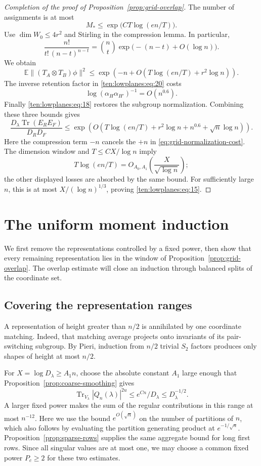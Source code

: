 \begin{proof}[Completion of the proof of Proposition~\ref{prop:grid-overlap}]
The number of assignments is at most
\[
 M_*\le\exp\!\bigl(C T\log(en/T)\bigr).
\]
Use \(\dim W_0\le4r^2\) and Stirling in the compression lemma.  In
particular,
\[
 \frac{n!}{t!\,(n-t)^{n-t}}
 =\binom nt\exp\!\bigl(-(n-t)+O(\log n)\bigr).
\]
We obtain
\[
 \mathbb E\|(T_A\otimes T_B)\phi\|^2
 \le
 \exp\!\left(-n+
 O\!\left(T\log(en/T)+r^2\log n\right)\right).
\]
The inverse retention factor in \eqref{ten:lowplanes:eq:20} costs
\[
 \log(\alpha_H\alpha_{H'})^{-1}=O(n^{0.6}).
\]
Finally \eqref{ten:lowplanes:eq:18} restores the subgroup normalization.
Combining these three bounds gives
\[
 \frac{D_\lambda\operatorname{Tr}(E_RE_F)}{D_RD_F}
 \le
 \exp\!\left(O\!\left(
 T\log(en/T)+r^2\log n+n^{0.6}+\sqrt n\log n
 \right)\right).
\]
Here the compression term \(-n\) cancels the \(+n\) in
\eqref{eq:grid-normalization-cost}.  The dimension window and
\(T\le CX/\log n\) imply
\[
 T\log(en/T)=O_{A_0,A_1}\!\left(\frac{X}{\sqrt{\log n}}\right);
\]
the other displayed losses are absorbed by the same bound.
For sufficiently large \(n\), this is at most
\(X/(\log n)^{1/3}\), proving \eqref{ten:lowplanes:eq:15}.
\end{proof}


\section{The uniform moment induction}
\label{ten:lowplanes:part:309}
We first remove the representations controlled by a fixed power, then show that every remaining representation lies in the window of Proposition~\ref{prop:grid-overlap}. The overlap estimate will close an induction through balanced splits of the coordinate set.

\subsection{Covering the representation ranges}
A representation of height greater than $n/2$ is annihilated by one coordinate matching. Indeed, that matching average projects onto invariants of its pair-switching subgroup. By Pieri, induction from $n/2$ trivial $S_2$ factors produces only shapes of height at most $n/2$.

For $X=\log D_\lambda\ge A_1n$, choose the absolute constant $A_1$ large enough that Proposition~\ref{prop:coarse-smoothing} gives
\[
 \operatorname{Tr}_{V_\lambda}|Q_n(\lambda)|^{2u}
 \le e^{Cn}/D_\lambda\le D_\lambda^{-1/2}.
\]
A larger fixed power makes the sum of the regular contributions in this range at most $n^{-12}$. Here we use the bound $e^{O(\sqrt n)}$ on the number of partitions of $n$, which also follows by evaluating the partition generating product at $e^{-1/\sqrt n}$. Proposition~\ref{prop:sparse-rows} supplies the same aggregate bound for long first rows. Since all singular values are at most one, we may choose a common fixed power $P_c\ge2$ for these two estimates.

